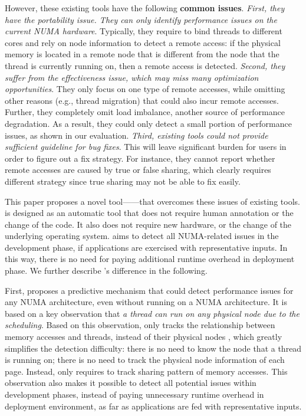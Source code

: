 However, these existing tools have the following \textbf{common issues}. \textit{First, they have the portability issue. They can only identify performance issues on the current NUMA hardware}. 
Typically, they require to bind threads to different cores and rely on  node information to detect a remote access: if the physical memory is located in a remote node that is different from the node that the thread is currently running on, then a remote access is detected. \textit{Second, they suffer from the effectiveness issue, which may miss many optimization opportunities}. They only focus on one type of remote accesses, while omitting other reasons (e.g., thread migration) that could also incur remote accesses. Further, they completely omit load imbalance, another source of performance degradation. As a result, they could only detect a small portion of performance issues, as shown in our evaluation. \textit{Third, existing tools could not provide sufficient guideline for bug fixes}. This will leave significant burden for users in order to figure out a fix strategy. For instance, they cannot report whether remote accesses are caused by true or false sharing, which clearly requires different strategy since true sharing may not be able to fix easily.   


This paper proposes a novel tool---\NP{}---that overcomes these issues of existing tools. \NP{} is designed as an automatic tool that does not require human annotation or the change of the code. It also does not require new hardware, or the change of the underlying operating system. \NP{} aims to detect all NUMA-related issues in the development phase, if applications are exercised with representative inputs. In this way, there is no need for paying additional runtime overhead in deployment phase. We further describe \NP{}'s difference in the following. 

First, \NP{} proposes a predictive mechanism that could detect performance issues for any NUMA architecture, even without running on a NUMA architecture. It is based on a key observation that \textit{a thread can run on any physical node due to the scheduling}. Based on this observation, \NP{} only tracks the relationship between memory accesses and threads, instead of their physical nodes , which greatly simplifies the detection difficulty: there is no need to know the node that a thread is running on; there is no need to track the physical node information of each page. Instead, \NP{} only requires to track sharing pattern of memory accesses. This observation also makes it possible to detect all potential issues within development phases, instead of paying unnecessary runtime overhead in deployment environment, as far as applications are fed with representative inputs. 


